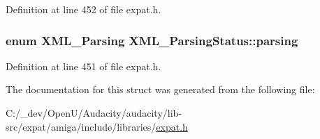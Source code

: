Definition at line 452 of file expat.\+h.

\subsubsection[{\texorpdfstring{parsing}{parsing}}]{\setlength{\rightskip}{0pt plus 5cm}enum {\bf X\+M\+L\+\_\+\+Parsing} X\+M\+L\+\_\+\+Parsing\+Status\+::parsing}\hypertarget{struct_x_m_l___parsing_status_af7f58f4731cf34a10da39dd7b9cfb82b}{}\label{struct_x_m_l___parsing_status_af7f58f4731cf34a10da39dd7b9cfb82b}


Definition at line 451 of file expat.\+h.



The documentation for this struct was generated from the following file\+:\begin{DoxyCompactItemize}
\item 
C\+:/\+\_\+dev/\+Open\+U/\+Audacity/audacity/lib-\/src/expat/amiga/include/libraries/\hyperlink{amiga_2include_2libraries_2expat_8h}{expat.\+h}\end{DoxyCompactItemize}
